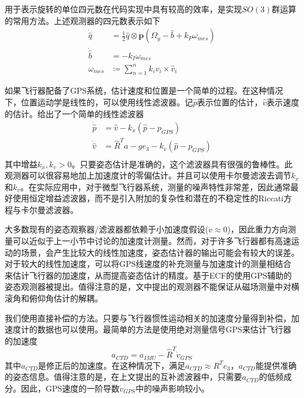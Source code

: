 \documentclass[
  type=master
]{gdutthesis}
\begin{document}
用于表示旋转的单位四元数在代码实现中具有较高的效率，是实现$SO(3)$群运算的常用方法。上述观测器的四元数表示如下
\begin{equation}\label{eq:quatfilter}
	\begin{aligned}
	\dot{\hat{q}}&=\frac{1}{2} \hat{q} \otimes \mathbf{p}(\Omega_y - \hat{b} + k_P \omega_{mes})\\
	\dot{\hat{b}}&=-k_I \omega_{mes}\\
	\omega_{mes} &\coloneqq \sum_{n=1}^{n} k_i v_i \times \hat{v}_i	
\end{aligned}
\end{equation}

如果飞行器配备了GPS系统，估计速度和位置是一个简单的过程。在这种情况下，位置运动学是线性的，可以使用线性滤波器。记$\hat{p}$表示位置的估计，$\hat{v}$表示速度的估计。给出了一个简单的线性滤波器
\begin{equation}\label{eq:posfilter}
	\begin{aligned}
		\dot{\hat{p}}&=\hat{v}-k_x (\hat{p}-p_{GPS})\\
		\dot{\hat{v}}&=\hat{R}^T a - g e_3 - k_v (\hat{p}-p_{GPS})\\	
	\end{aligned}
\end{equation}
其中增益$k_x,k_v > 0$。只要姿态估计是准确的，这个滤波器具有很强的鲁棒性。此观测器可以很容易地加上加速度计的零偏估计。并且可以使用卡尔曼滤波去调节$k_x$和$k_v$。在实际应用中，对于微型飞行器系统，测量的噪声特性非常差，因此通常最好使用恒定增益滤波器，而不是引入附加的复杂性和潜在的不稳定性的Riccati方程与卡尔曼滤波器。

大多数现有的姿态观察器/滤波器都依赖于小加速度假设($\dot{v}\approx 0$)，因此重力方向测量可以近似于上一小节中讨论的加速度计测量。然而，对于许多飞行器都有高速运动的场景，会产生比较大的线性加速度，姿态估计器的输出可能会有较大的误差。对于较大的线性加速度，可以将GPS线速度的补充测量与加速度计的测量相结合来估计飞行器的加速度，从而提高姿态估计的精度。基于ECF的使用GPS辅助的姿态观测器被提出\cite{hua2010attitude}。值得注意的是，文中提出的观测器不能保证从磁场测量中对横滚角和俯仰角估计的解耦。

我们使用直接补偿的方法。只要与飞行器惯性运动相关的加速度分量得到补偿，加速度计的数据也可以使用。最简单的方法是使用绝对测量信号GPS来估计飞行器的加速度
\begin{equation}
	a_{CTD}=a_{IMU}-\hat{R}^T \dot{v}_{GPS}
\end{equation}
其中$a_{CTD}$是修正后的加速度。在这种情况下，满足$a_{CTD} \approx R^T e_3$，$a_{CTD}$能提供准确的姿态信息。值得注意的是，在上文提出的互补滤波器中，只需要$a_{CTD}$的低频成分。因此，GPS速度的一阶导数$\dot{v}_{GPS}$中的噪声影响较小。
\end{document}
